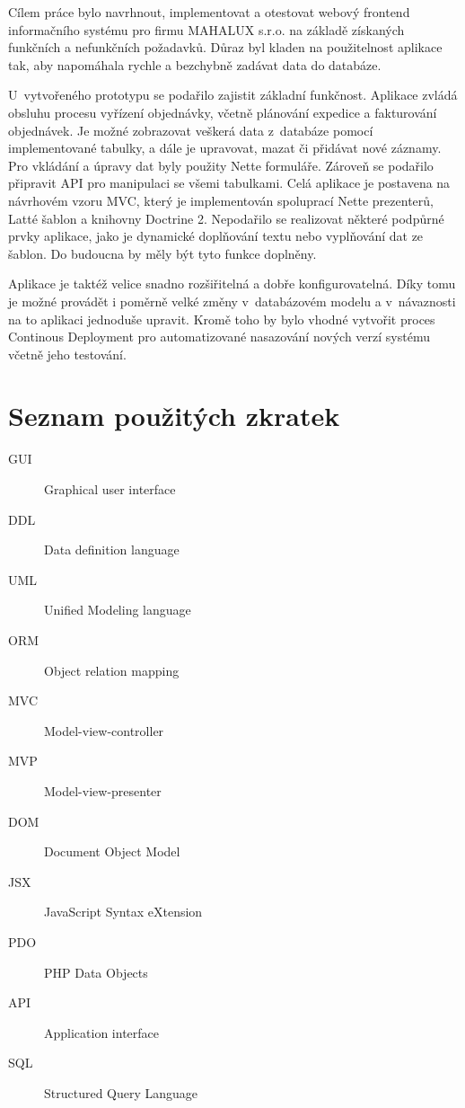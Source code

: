 \documentclass[thesis=B,czech]{FITthesis}[2012/06/26]
\begin{document}
\begin{conclusion}
	Cílem práce bylo navrhnout, implementovat a otestovat webový frontend informačního systému pro firmu MAHALUX s.r.o. na základě získaných funkčních a nefunkčních požadavků. Důraz byl kladen na použitelnost aplikace tak, aby napomáhala rychle a bezchybně zadávat data do databáze.
	
	U~vytvořeného prototypu se podařilo zajistit základní funkčnost. Aplikace zvládá obsluhu procesu vyřízení objednávky, včetně plánování expedice a fakturování objednávek. Je možné zobrazovat veškerá data z~databáze pomocí implementované tabulky, a dále je upravovat, mazat či přidávat nové záznamy. Pro vkládání a úpravy dat byly použity Nette formuláře. Zároveň se podařilo připravit API pro manipulaci se všemi tabulkami. Celá aplikace je postavena na návrhovém vzoru MVC, který je implementován spoluprací Nette prezenterů, Latté šablon a knihovny Doctrine 2. Nepodařilo se realizovat některé podpůrné prvky aplikace, jako je dynamické doplňování textu nebo vyplňování dat ze šablon. Do budoucna by měly být tyto funkce doplněny. 
	
	Aplikace je taktéž velice snadno rozšiřitelná a dobře konfigurovatelná. Díky tomu je možné provádět i poměrně velké změny v~databázovém modelu a v~návaznosti na to aplikaci jednoduše upravit. Kromě toho by bylo vhodné vytvořit proces Continous Deployment pro automatizované nasazování nových verzí systému včetně jeho testování.
\end{conclusion}




\appendix

\chapter{Seznam použitých zkratek}
\begin{description}
	\item[GUI] Graphical user interface
	\item[DDL] Data definition language
	\item[UML] Unified Modeling language
	\item[ORM] Object relation mapping
	\item[MVC] Model-view-controller
	\item[MVP] Model-view-presenter
	\item[DOM] Document Object Model
	\item[JSX] JavaScript Syntax eXtension
	\item[PDO] PHP Data Objects
	\item[API] Application interface
	\item[SQL] Structured Query Language
\end{description}
\end{document}
